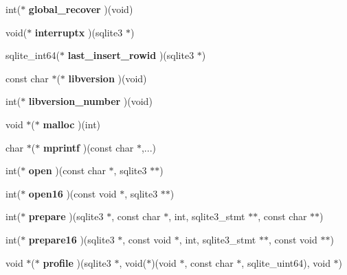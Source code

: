 \begin{CompactItemize}
\item 
int($\ast$ \textbf{global\_\-recover} )(void)\label{structsqlite3__api__routines_918aa1cd34b7573aac518d595026e3aa}

\item 
void($\ast$ \textbf{interruptx} )(sqlite3 $\ast$)\label{structsqlite3__api__routines_4d958a09991a2c8238221ad562606838}

\item 
sqlite\_\-int64($\ast$ \textbf{last\_\-insert\_\-rowid} )(sqlite3 $\ast$)\label{structsqlite3__api__routines_338a77e3cd0c9d7f664acec5e5abfe02}

\item 
const char $\ast$($\ast$ \textbf{libversion} )(void)\label{structsqlite3__api__routines_639729f68a52dfbc3827cf7903185bad}

\item 
int($\ast$ \textbf{libversion\_\-number} )(void)\label{structsqlite3__api__routines_3686398609925b47cf3a1543c02913b9}

\item 
void $\ast$($\ast$ \textbf{malloc} )(int)\label{structsqlite3__api__routines_7e6bbd5166f217b9aae04eddedc03039}

\item 
char $\ast$($\ast$ \textbf{mprintf} )(const char $\ast$,...)\label{structsqlite3__api__routines_02888424ae73cf3c7c0c67498e814162}

\item 
int($\ast$ \textbf{open} )(const char $\ast$, sqlite3 $\ast$$\ast$)\label{structsqlite3__api__routines_fa37a9239bbb695aee83ad18ef93881a}

\item 
int($\ast$ \textbf{open16} )(const void $\ast$, sqlite3 $\ast$$\ast$)\label{structsqlite3__api__routines_666c7efd77ff24494a5d554705124f28}

\item 
int($\ast$ \textbf{prepare} )(sqlite3 $\ast$, const char $\ast$, int, sqlite3\_\-stmt $\ast$$\ast$, const char $\ast$$\ast$)\label{structsqlite3__api__routines_a74749c95e34e59552b05aebbbd3b212}

\item 
int($\ast$ \textbf{prepare16} )(sqlite3 $\ast$, const void $\ast$, int, sqlite3\_\-stmt $\ast$$\ast$, const void $\ast$$\ast$)\label{structsqlite3__api__routines_c7388262aa9bdb624f1bf2510af53dd9}

\item 
void $\ast$($\ast$ \textbf{profile} )(sqlite3 $\ast$, void($\ast$)(void $\ast$, const char $\ast$, sqlite\_\-uint64), void $\ast$)\label{structsqlite3__api__routines_562fdf3ecaaee38a04acfde7ee5f16fa}


\end{CompactItemize}
